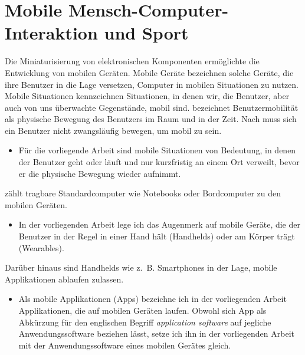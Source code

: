 

\section{Mobile Mensch-Computer-Interaktion und Sport} 

\label{sec:mobile_mensch_computer_interaktion_und_sport}

Die Miniaturisierung von elektronischen Komponenten ermöglichte die Entwicklung von mobilen Geräten. Mobile Geräte bezeichnen solche Geräte, die ihre Benutzer in die Lage versetzen, Computer in mobilen Situationen zu nutzen. Mobile Situationen kennzeichnen Situationen, in denen wir, die Benutzer, aber auch von uns überwachte Gegenstände, mobil sind. \citet[][S.~24ff.]{Cooper2002} bezeichnet Benutzermobilität als physische Bewegung des Benutzers im Raum und in der Zeit. Nach \citet[][S.~7]{Roth2005} muss sich ein Benutzer nicht zwangsläufig bewegen, um mobil zu sein. 
\begin{itemize}
	
	\item Für die vorliegende Arbeit sind mobile Situationen von Bedeutung, in denen der Benutzer geht oder läuft und nur kurzfristig an einem Ort verweilt, bevor er die physische Bewegung wieder aufnimmt. 
\end{itemize}

\citet[][S.~5]{Roth2005} zählt tragbare Standardcomputer wie Notebooks oder Bordcomputer zu den mobilen Geräten. 
\begin{itemize}
	
	\item In der vorliegenden Arbeit lege ich das Augenmerk auf mobile Geräte, die der Benutzer in der Regel in einer Hand hält (Handhelds) oder am Körper trägt (Wearables). 
\end{itemize}

Darüber hinaus sind Handhelds wie z.~B. Smartphones in der Lage, mobile Applikationen ablaufen zulassen. 
\begin{itemize}
	
	\item Als mobile Applikationen (Apps) bezeichne ich in der vorliegenden Arbeit Applikationen, die auf mobilen Geräten laufen. Obwohl sich App als Abkürzung für den englischen Begriff \emph{application software} auf jegliche Anwendungssoftware beziehen lässt, setze ich ihn in der vorliegenden Arbeit mit der Anwendungssoftware eines mobilen Gerätes gleich. 
\end{itemize}

